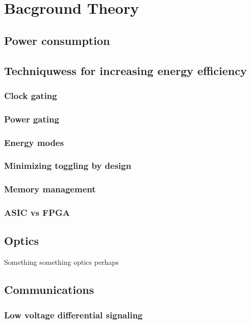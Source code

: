 \newpage
\section{Bacground Theory}
\subsection{Power consumption}
\subsection{Techniquwess for increasing energy efficiency}
\subsubsection{Clock gating}
\subsubsection{Power gating}
\subsubsection{Energy modes}
\subsubsection{Minimizing toggling by design}
\subsubsection{Memory management}
\subsubsection{ASIC vs FPGA}

\subsection{Optics}
Something something optics perhaps

\subsection{Communications}
\subsubsection{Low voltage differential signaling}

